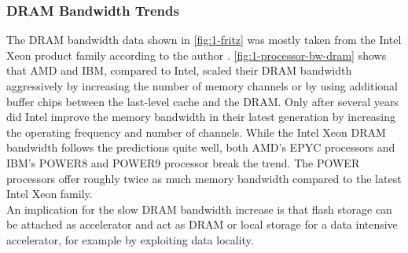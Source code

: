 \subsubsection{DRAM Bandwidth Trends}
The DRAM bandwidth data shown in \autoref{fig:1-fritz} was mostly taken from the Intel Xeon product family according to the author \cite{fritz}. \autoref{fig:1-processor-bw-dram} shows that AMD and IBM, compared to Intel, scaled their DRAM bandwidth aggressively by increasing the number of memory channels or by using additional buffer chips between the last-level cache and the DRAM. Only after several years did Intel improve the memory bandwidth in their latest generation by increasing the operating frequency and number of channels. While the Intel Xeon DRAM bandwidth follows the predictions quite well, both AMD's EPYC processors and IBM's POWER8 and POWER9 processor break the trend. The POWER processors offer roughly twice as much memory bandwidth compared to the latest Intel Xeon family.\\
An implication for the slow DRAM bandwidth increase is that flash storage can be attached as accelerator and act as DRAM or local storage for a data intensive accelerator, for example by exploiting data locality.



